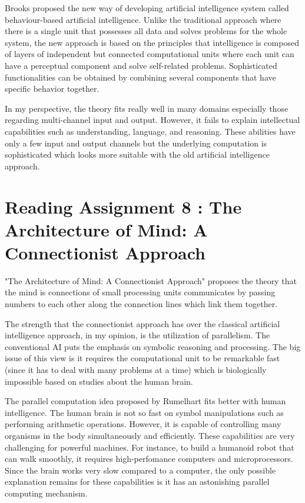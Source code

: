 \documentclass{article}
\begin{document}
Brooks proposed the new way of developing artificial intelligence system called behaviour-based artificial intelligence. Unlike the traditional approach where there is a single unit that possesses all data and solves problems for the whole system, the new approach is based on the principles that intelligence is composed of layers of independent but connected computational units where each unit can have a perceptual component and solve self-related problems. Sophisticated functionalities can be obtained by combining several components that have specific behavior together.

In my perspective, the theory fits really well in many domains especially those regarding multi-channel input and output. However, it fails to explain intellectual capabilities such as understanding, language, and reasoning. These abilities have only a few input and output channels but the underlying computation is sophisticated which looks more suitable with the old artificial intelligence approach.

\section*{Reading Assignment 8 : The Architecture of Mind: A Connectionist Approach}

"The Architecture of Mind: A Connectionist Approach" proposes the theory that the mind is connections of small processing units communicates by passing numbers to each other along the connection lines which link them together.

The strength that the connectionist approach has over the classical artificial intelligence approach, in my opinion, is the utilization of parallelism. The conventional AI puts the emphasis on symbolic reasoning and processing. The big issue of this view is it requires the computational unit to be remarkable fast (since it has to deal with many problems at a time) which is biologically impossible based on studies about the human brain.

The parallel computation idea proposed by Rumelhart fits better with human intelligence. The human brain is not so fast on symbol manipulations such as performing arithmetic operations. However, it is capable of controlling many organisms in the body simultaneously and efficiently. These capabilities are very challenging for powerful machines. For instance, to build a humanoid robot that can walk smoothly, it requires high-perfomance computers and microprocessors. Since the brain works very slow compared to a computer, the only possible explanation remains for these capabilities is it has an astonishing parallel computing mechanism.
\end{document}
